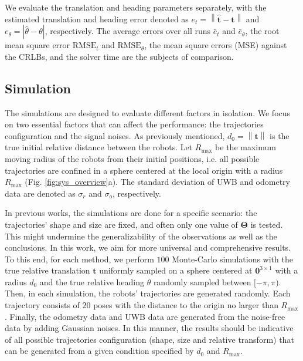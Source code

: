 \documentclass[journal]{IEEEtran}
\newcommand{\norm}[1]{\left\lVert#1\right\rVert}
\newcommand{\abs}[1]{\left\lvert#1\right\rvert}
\def\StateVector{\mathbf{\Theta}}
\begin{document}
We evaluate the translation and heading parameters separately, with the estimated translation and heading error denoted as $e_t = \norm{\hat{\mathbf{t}} - \mathbf{t}}$ and $e_{\theta} = \abs{\hat{\theta} - \theta}$, respectively.
The average errors over all runs $\bar{e}_t$ and $\bar{e}_{\theta}$, the root mean square error $\textrm{RMSE}_t$ and $\textrm{RMSE}_{\theta}$, the mean square errors (MSE) against the CRLBs, and the solver time are the subjects of comparison.

\subsection{Simulation}

The simulations are designed to evaluate different factors in isolation. We focus on two essential factors that can affect the performance: the trajectories configuration and the signal noises.
As previously mentioned, $d_0 = \norm{\mathbf{t}}$ is the true initial relative distance between the robots. 
Let $R_{\max}$ be the maximum moving radius of the robots from their initial positions, i.e. all possible trajectories are confined in a sphere centered at the local origin with a radius $R_{\max}$ (Fig. \ref{fig:sys_overview}a). The standard deviation of UWB and odometry data are denoted as $\sigma_r$ and $\sigma_o$, respectively.

In previous works, the simulations are done for a specific scenario: the trajectories' shape and size are fixed, and often only one value of $\StateVector$ is tested. This might undermine the generalizability of the observations as well as the conclusions. In this work, we aim for more universal and comprehensive results. To this end, for each method, we perform $100$ Monte-Carlo simulations with the true relative translation $\mathbf{t}$ uniformly sampled on a sphere centered at $\mathbf{0}^{3\times1}$ with a radius $d_0$ and the true relative heading $\theta$ randomly sampled between $[-\pi,\pi)$. Then, in each simulation, the robots' trajectories are generated randomly. Each trajectory consists of $20$ poses with the distance to the origin no larger than $R_{\max}$. Finally, the odometry data and UWB data are generated from the noise-free data by adding Gaussian noises. In this manner, the results should be indicative of all possible trajectories configuration (shape, size and relative transform) that can be generated from a given condition specified by $d_0$ and $R_{\max}$.
\end{document}
